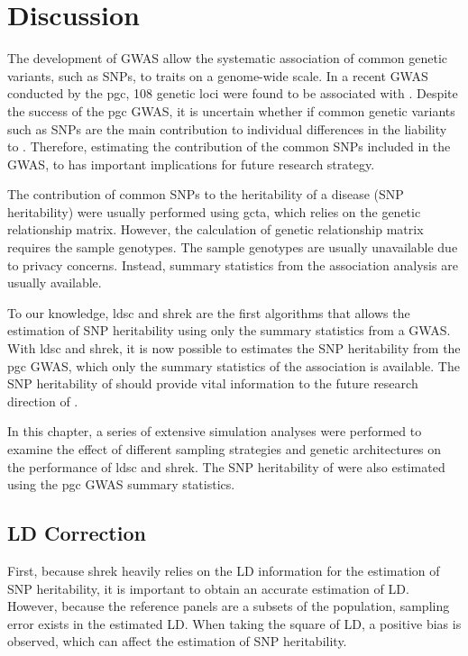 	\section{Discussion}
	The development of \gls{GWAS} allow the systematic association of common genetic variants, such as \glspl{SNP}, to traits on a genome-wide scale.
	In a recent \gls{GWAS} conducted by the \gls{pgc}, 108 genetic loci were found to be associated with  \citep{Ripke2014}.
	Despite the success of the \gls{pgc}  \gls{GWAS}, it is uncertain whether if common genetic variants such as \glspl{SNP} are the main contribution to individual differences in the liability to .
	Therefore, estimating the contribution of the common \glspl{SNP} included in the \gls{GWAS}, to  has important implications for future research strategy. 
	
	The contribution of common \glspl{SNP} to the heritability of a disease (\gls{SNP} heritability) were usually performed using \gls{gcta}, which relies on the genetic relationship matrix.
	However, the calculation of genetic relationship matrix requires the sample genotypes.
	The sample genotypes are usually unavailable due to privacy concerns.
	Instead, summary statistics from the association analysis are usually available.

	To our knowledge, \gls{ldsc} and \gls{shrek} are the first algorithms that allows the estimation of \gls{SNP} heritability using only the summary statistics from a \gls{GWAS}.
	With \gls{ldsc} and \gls{shrek}, it is now possible to estimates the \gls{SNP} heritability from the \gls{pgc}  \gls{GWAS}, which only the summary statistics of the association is available.
	The \gls{SNP} heritability of  should provide vital information to the future research direction of .
	
	
	In this chapter, a series of extensive simulation analyses were performed to examine the effect of different sampling strategies and genetic architectures on the performance of \gls{ldsc} and \gls{shrek}.
	The \gls{SNP} heritability of  were also estimated using the \gls{pgc}  \gls{GWAS} summary statistics.
	
	\subsection{LD Correction}
	First, because \gls{shrek} heavily relies on the \gls{LD} information for the estimation of \gls{SNP} heritability, it is important to obtain an accurate estimation of \gls{LD}.
	However, because the reference panels are a subsets of the population, sampling error exists in the estimated \gls{LD}.
	When taking the square of \gls{LD}, a positive bias is observed, which can affect the estimation of \gls{SNP} heritability.
	
